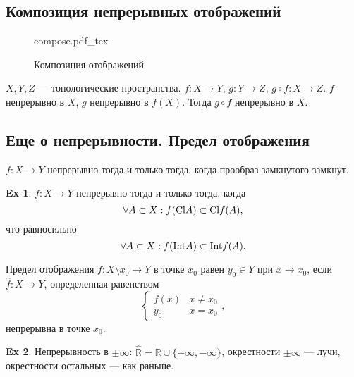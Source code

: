 \documentclass[11pt]{book}
\newcommand{\incfig}[1]{%
    \def\svgwidth{\columnwidth}
    {#1.pdf_tex}
}
\newcommand{\R}{\mathbb{R}}
\newcommand{\Cl}{{\mathop{\text{\rm Cl}}}}
\newcommand{\Int}{{\mathop{\text{\rm Int}}}}
\theoremstyle{definition}
\theoremstyle{plain}
\theoremstyle{plain}
\theoremstyle{definition}
\newtheorem*{ex}{Ex}
\theoremstyle{remark}
\begin{document}
\subsection{Композиция непрерывных отображений}
\begin{figure}[ht]
    \centering
    \incfig{compose}
    \caption{Композиция отображений}
    \label{fig:compose}
\end{figure}
\begin{thm}
    $ X, Y, Z$ --- топологические пространства. $ f: X \to  Y$, $ g: Y \to Z $, $ g \circ f: X \to  Z$.
    $ f$ непрерывно в $ X$,  $ g$ непрерывно в $ f(X)$. Тогда $ g \circ f $ непрерывно в $ X$.
\end{thm}
\subsection{Еще о непрерывности. Предел отображения}
\begin{thm}
    $ f: X \to  Y$ непрерывно тогда и только тогда, когда прообраз замкнутого замкнут.
\end{thm}
\begin{ex}
    $ f: X \to  Y$ непрерывно тогда и только тогда, когда 
    \[
	\forall A \subset X: f(\Cl A) \subset \Cl f(A) 
    ,\] 
    что равносильно
    \[
	\forall A \subset X: f(\Int A) \subset \Int f(A) 
    .\] 
\end{ex}
\begin{defn}
    Предел отображения $ f: X\setminus {x_0} \to  Y $ в точке $ x_0$ равен $ y_0 \in Y$ при $ x \to  x_0$, если $ \hat{f}: X \to  Y$, определенная равенством \[
    \begin{cases}
	f(x) & x \ne x_0 \\
	y_0 & x = x_0
    \end{cases}
    ,\] 
    непрерывна в точке $ x_0$.
\end{defn}
\begin{ex}
    Непрерывность в $ \pm \infty$: $ \hat{\R} = \R \cup \{+ \infty, -\infty\}$, окрестности $ \pm \infty$ --- лучи, окрестности остальных --- как раньше.
\end{ex}
\end{document}
